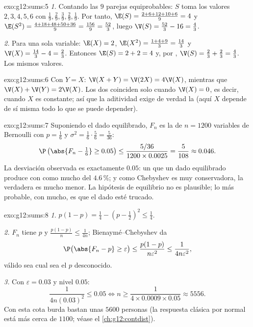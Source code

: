 \begin{solution}{exo:g12:sums:5}
\emph{1.} Contando las $9$ parejas equiprobables: $S$ toma los valores
$2, 3, 4, 5, 6$ con 
$\frac19, \frac29, \frac39, \frac29, \frac19$. Por tanto,
$\E(S) = \frac{2 + 6 + 12 + 10 + 6}{9} = 4$ y
$\E(S^2) = \frac{4 + 18 + 48 + 50 + 36}{9} = \frac{156}{9} = \frac{52}{3}$,
luego $\V(S) = \frac{52}{3} - 16 = \frac43$.

\emph{2.} Para una sola variable: $\E(X) = 2$,
$\E(X^2) = \frac{1 + 4 + 9}{3} = \frac{14}{3}$ y
$\V(X) = \frac{14}{3} - 4 = \frac23$. Entonces $\E(S) = 2 + 2 = 4$ y, por
, $\V(S) = \frac23 + \frac23 = \frac43$. Los mismos valores.
\end{solution}

\begin{solution}{exo:g12:sums:6}
Con $Y = X$: $\V(X + Y) = \V(2X) = 4\V(X)$, mientras que
$\V(X) + \V(Y) = 2\V(X)$. Los dos coinciden solo cuando $\V(X) = 0$, es
decir, cuando $X$ es constante; así que la aditividad exige de verdad la
 (aquí $X$ depende de sí misma todo lo que se puede depender).
\end{solution}

\begin{solution}{exo:g12:sums:7}
Suponiendo el dado equilibrado, $F_n$ es la  de $n = 1200$ variables
de Bernoulli con $p = \frac16$ y
$\sigma^2 = \frac16\cdot\frac56 = \frac{5}{36}$:
\[
\P\left(\abs{F_n - \tfrac16} \geq 0.05\right)
\leq \frac{5/36}{1200 \times 0.0025} = \frac{5}{108} \approx 0.046 .
\]
La desviación observada es exactamente $0.05$: un  que un dado
equilibrado produce con  como mucho del $4.6\,\%$; y como
Chebyshev es muy conservadora, la  verdadera es mucho menor. La
hipótesis de equilibrio no es plausible; lo más probable, con mucho, es que
el dado esté trucado.
\end{solution}

\begin{solution}{exo:g12:sums:8}
\emph{1.} $p(1-p) = \frac14 - \left(p - \frac12\right)^2 \leq \frac14$.

\emph{2.} $F_n$ tiene  $p$ y 
$\frac{p(1-p)}{n} \leq \frac{1}{4n}$; Bienaymé--Chebyshev da
\[
\P\bigl(\abs{F_n - p} \geq \varepsilon\bigr)
\leq \frac{p(1-p)}{n\varepsilon^2} \leq \frac{1}{4n\varepsilon^2},
\]
válido sea cual sea el $p$ desconocido.

\emph{3.} Con $\varepsilon = 0.03$ y nivel $0.05$:
\[
\frac{1}{4n(0.03)^2} \leq 0.05
\iff n \geq \frac{1}{4 \times 0.0009 \times 0.05} \approx 5556 .
\]
Con esta cota burda bastan unas $5600$ personas (la respuesta clásica por
 normal está más cerca de $1100$; véase el
\cref{ch:g12:contdist}).
\end{solution}

